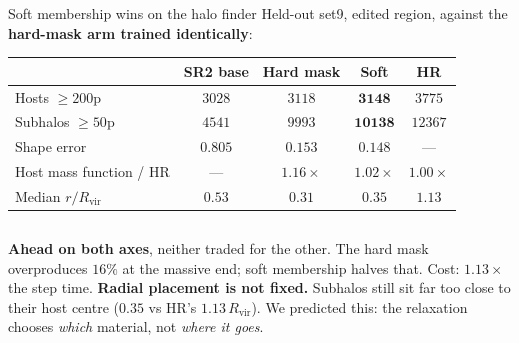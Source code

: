 \documentclass[aspectratio=169]{beamer}
\begin{document}
\begin{frame}{Soft membership wins on the halo finder}
\small
Held-out set9, edited region, against the \textbf{hard-mask arm trained
identically}:
\vspace{0.2cm}

\centering
\begin{tabular}{l c c c c}
\hline
 & SR2 base & Hard mask & \textbf{Soft} & HR \\
\hline
Hosts $\ge200$p          & $3028$ & $3118$ & $\mathbf{3148}$ & $3775$ \\
Subhalos $\ge50$p        & $4541$ & $9993$ & $\mathbf{10138}$ & $12367$ \\
Shape error              & $0.805$ & $0.153$ & $\mathbf{0.148}$ & --- \\
Host mass function / HR  & --- & $1.16\times$ & $\mathbf{1.02\times}$ & $1.00\times$ \\
\hline
Median $r/R_{\mathrm{vir}}$ & $0.53$ & $0.31$ & $0.35$ & $\mathbf{1.13}$ \\
\hline
\end{tabular}

\vspace{0.3cm}
\begin{columns}[T]
{\footnotesize
\textbf{Ahead on both axes}, neither traded for the other. The hard mask
overproduces $16\%$ at the massive end; soft membership halves that.
Cost: $1.13\times$ the step time.}
{\footnotesize
\alert{\textbf{Radial placement is not fixed.}} Subhalos still sit far too close
to their host centre ($0.35$ vs HR's $1.13\,R_{\mathrm{vir}}$). We predicted
this: the relaxation chooses \emph{which} material, not \emph{where it goes}.}
\end{columns}
\end{frame}

\end{document}
